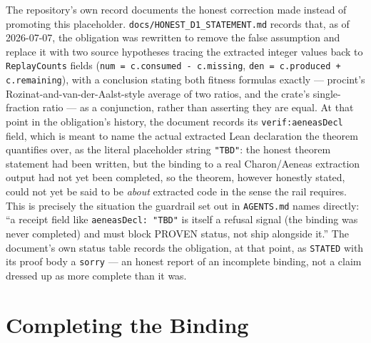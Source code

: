 The repository's own record documents the honest correction made instead
of promoting this placeholder. \texttt{docs/HONEST\_D1\_STATEMENT.md}
records that, as of 2026-07-07, the obligation was rewritten to remove
the false assumption and replace it with two source hypotheses tracing
the extracted integer values back to \texttt{ReplayCounts} fields
(\texttt{num = c.consumed - c.missing}, \texttt{den = c.produced +
c.remaining}), with a conclusion stating both fitness formulas exactly ---
\textsf{procint}'s Rozinat-and-van-der-Aalst-style average of two ratios,
and the crate's single-fraction ratio --- as a conjunction, rather than
asserting they are equal. At that point in the obligation's history, the
document records its \texttt{verif:aeneasDecl} field, which is meant to
name the actual extracted Lean declaration the theorem quantifies over,
as the literal placeholder string \texttt{"TBD"}: the honest theorem
statement had been written, but the binding to a real Charon/Aeneas
extraction output had not yet been completed, so the theorem, however
honestly stated, could not yet be said to be \emph{about} extracted code
in the sense the rail requires. This is precisely the situation the
guardrail set out in \texttt{AGENTS.md} names directly: ``a receipt field
like \texttt{aeneasDecl: "TBD"} is itself a refusal signal (the binding
was never completed) and must block PROVEN status, not ship alongside
it.'' The document's own status table records the obligation, at that
point, as \texttt{STATED} with its proof body a \texttt{sorry} --- an
honest report of an incomplete binding, not a claim dressed up as more
complete than it was.

\section{Completing the Binding}
\label{sec:correspondence-guard}

